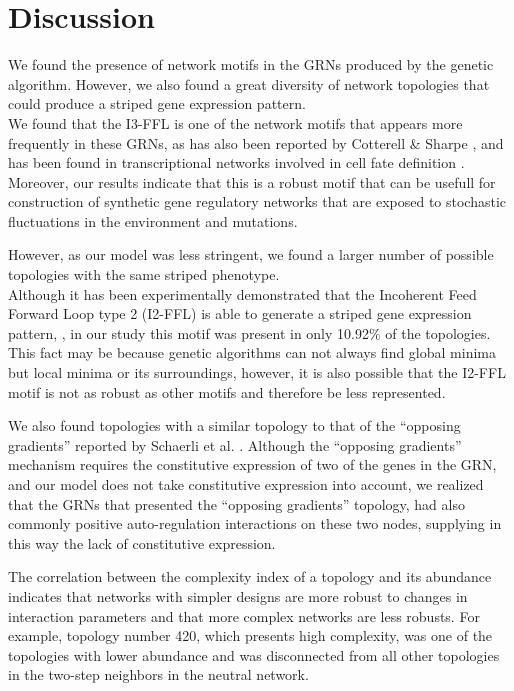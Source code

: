 \documentclass[10pt,letterpaper]{article}
\begin{document}
\section*{Discussion}

We found the presence of network motifs in the GRNs produced by the genetic
algorithm. However, we also found a great diversity of network topologies that
could produce a striped gene expression pattern.\\

We found that the I3-FFL is one of the network motifs that appears more
frequently in these GRNs, as has also been reported by Cotterell \& Sharpe
\cite{Cotterell2010}, and has been found in transcriptional networks involved 
in cell fate definition \cite{Li2019}. Moreover, our results indicate that this 
is a robust motif that can be usefull for construction of synthetic gene 
regulatory networks that are exposed to stochastic fluctuations in the 
environment and mutations.

However, as our model was less stringent, we found a larger number of possible 
topologies with the same striped phenotype.\\

Although it has been experimentally demonstrated that the Incoherent Feed 
Forward Loop type 2 (I2-FFL) is able to generate a striped gene expression 
pattern, \cite{Schaerli2014, Basu2005}, in our study this motif was present in 
only 10.92\% of the topologies. This fact may be because genetic algorithms 
can not always find global minima but local minima or its surroundings, however,
it is also possible that the I2-FFL motif is not as robust as other motifs and 
therefore be less represented.

We also found topologies with a similar topology to that of the “opposing
gradients” reported by Schaerli et al. \cite{Schaerli2018,Schaerli2014}.
Although the “opposing gradients” mechanism requires the constitutive expression
of two of the genes in the GRN, and our model does not take constitutive
expression into account, we realized that the GRNs that presented the “opposing
gradients” topology, had also commonly positive auto-regulation interactions on
these two nodes, supplying in this way the lack of constitutive expression.

The correlation between the complexity index of a topology and its abundance 
indicates that networks with simpler designs are more robust to changes in 
interaction parameters and that more complex networks are less robusts. For 
example, topology number 420, which presents high complexity, was one of the 
topologies with lower abundance and was disconnected from all other topologies 
in the two-step neighbors in the neutral network.
\end{document}
